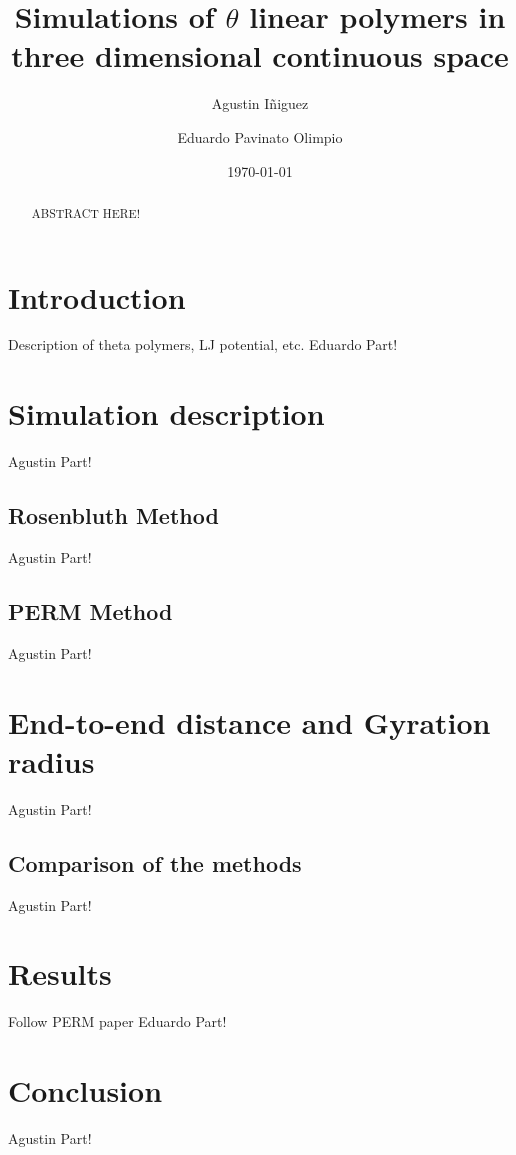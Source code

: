 \documentclass[aps,prl,reprint,groupedaddress]{revtex4-1}
\begin{document}
\title{Simulations of $\theta$ linear polymers in three dimensional continuous space}

\author{Agustin I\~niguez}
\author{Eduardo Pavinato Olimpio}


\date{\today}

\begin{abstract}
	ABSTRACT HERE!
\end{abstract}

\maketitle

\section{Introduction}
Description of theta polymers, LJ potential, etc.
Eduardo Part!

\section{Simulation description \label{description}}
Agustin Part!

\subsection{Rosenbluth Method}
Agustin Part!

\subsection{PERM Method}
Agustin Part!

\section{End-to-end distance and Gyration radius}

Agustin Part!

\subsection{Comparison of the methods}
Agustin Part!

\section{Results}

Follow PERM paper
Eduardo Part!

\section{Conclusion \label{conclusion}}
Agustin Part!

%
\end{document}
